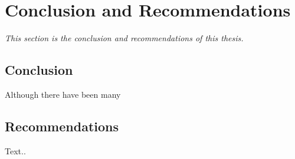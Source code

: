 \setlength{\footskip}{8mm}

\chapter{Conclusion and Recommendations}
\label{ch:conclusion}

\textit{This section is the conclusion and recommendations of this thesis.}

\section{Conclusion}

Although there have been many 

\section{Recommendations}

Text..

\FloatBarrier

